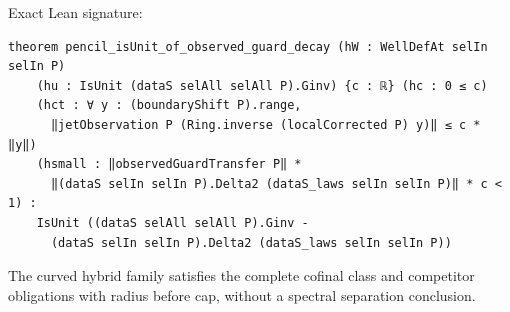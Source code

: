 \begin{theorem}[bp-252]
\begin{itemize}
\end{itemize}
\par Exact Lean signature:
\begin{verbatim}
theorem pencil_isUnit_of_observed_guard_decay (hW : WellDefAt selIn selIn P)
    (hu : IsUnit (dataS selAll selAll P).Ginv) {c : ℝ} (hc : 0 ≤ c)
    (hct : ∀ y : (boundaryShift P).range,
      ‖jetObservation P (Ring.inverse (localCorrected P) y)‖ ≤ c * ‖y‖)
    (hsmall : ‖observedGuardTransfer P‖ *
      ‖(dataS selIn selIn P).Delta2 (dataS_laws selIn selIn P)‖ * c < 1) :
    IsUnit ((dataS selAll selAll P).Ginv -
      (dataS selIn selIn P).Delta2 (dataS_laws selIn selIn P))
\end{verbatim}
\end{theorem}

\begin{theorem}[bp-253]
\label{bp-253}
\uses{}
\leanok
The curved hybrid family satisfies the complete cofinal class and competitor obligations with radius before cap, without a spectral separation conclusion.


\end{theorem}

